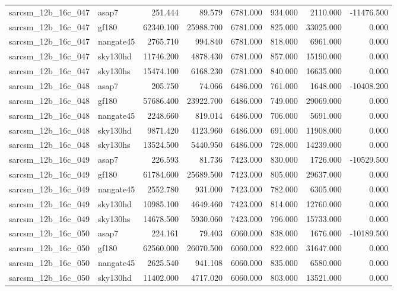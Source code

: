 \begin{tabular}{llrrrrrr}
sarcsm\_12b\_16c\_047 & asap7 & 251.444 & 89.579 & 6781.000 & 934.000 & 2110.000 & -11476.500 \\
sarcsm\_12b\_16c\_047 & gf180 & 62340.100 & 25988.700 & 6781.000 & 825.000 & 33025.000 & 0.000 \\
sarcsm\_12b\_16c\_047 & nangate45 & 2765.710 & 994.840 & 6781.000 & 818.000 & 6961.000 & 0.000 \\
sarcsm\_12b\_16c\_047 & sky130hd & 11746.200 & 4878.430 & 6781.000 & 857.000 & 15190.000 & 0.000 \\
sarcsm\_12b\_16c\_047 & sky130hs & 15474.100 & 6168.230 & 6781.000 & 840.000 & 16635.000 & 0.000 \\
sarcsm\_12b\_16c\_048 & asap7 & 205.750 & 74.066 & 6486.000 & 761.000 & 1648.000 & -10408.200 \\
sarcsm\_12b\_16c\_048 & gf180 & 57686.400 & 23922.700 & 6486.000 & 749.000 & 29069.000 & 0.000 \\
sarcsm\_12b\_16c\_048 & nangate45 & 2248.660 & 819.014 & 6486.000 & 706.000 & 5691.000 & 0.000 \\
sarcsm\_12b\_16c\_048 & sky130hd & 9871.420 & 4123.960 & 6486.000 & 691.000 & 11908.000 & 0.000 \\
sarcsm\_12b\_16c\_048 & sky130hs & 13524.500 & 5440.950 & 6486.000 & 728.000 & 14239.000 & 0.000 \\
sarcsm\_12b\_16c\_049 & asap7 & 226.593 & 81.736 & 7423.000 & 830.000 & 1726.000 & -10529.500 \\
sarcsm\_12b\_16c\_049 & gf180 & 61784.600 & 25689.500 & 7423.000 & 805.000 & 29637.000 & 0.000 \\
sarcsm\_12b\_16c\_049 & nangate45 & 2552.780 & 931.000 & 7423.000 & 782.000 & 6305.000 & 0.000 \\
sarcsm\_12b\_16c\_049 & sky130hd & 10985.100 & 4649.460 & 7423.000 & 814.000 & 12760.000 & 0.000 \\
sarcsm\_12b\_16c\_049 & sky130hs & 14678.500 & 5930.060 & 7423.000 & 796.000 & 15733.000 & 0.000 \\
sarcsm\_12b\_16c\_050 & asap7 & 224.161 & 79.403 & 6060.000 & 838.000 & 1676.000 & -10189.500 \\
sarcsm\_12b\_16c\_050 & gf180 & 62560.000 & 26070.500 & 6060.000 & 822.000 & 31647.000 & 0.000 \\
sarcsm\_12b\_16c\_050 & nangate45 & 2625.540 & 941.108 & 6060.000 & 835.000 & 6580.000 & 0.000 \\
sarcsm\_12b\_16c\_050 & sky130hd & 11402.000 & 4717.020 & 6060.000 & 803.000 & 13521.000 & 0.000 \\

\end{tabular}
